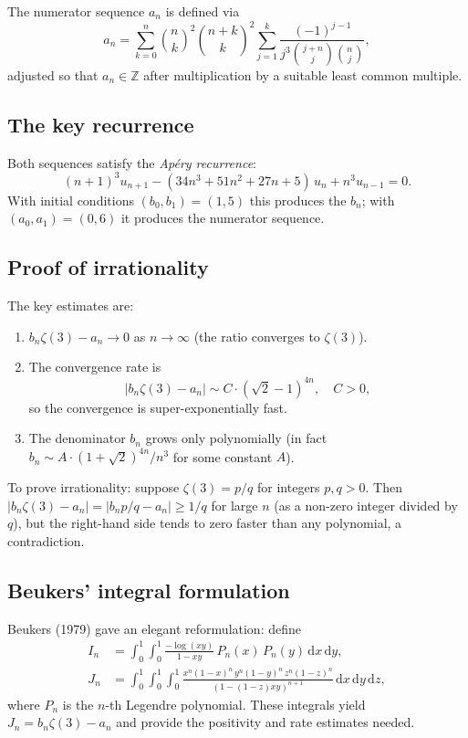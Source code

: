 \documentclass[12pt,a4paper]{amsart}
\theoremstyle{definition}
\theoremstyle{remark}
\begin{document}
The numerator sequence $a_n$ is defined via
\[
  a_n = \sum_{k=0}^{n} \binom{n}{k}^2 \binom{n+k}{k}^2
        \sum_{j=1}^{k} \frac{(-1)^{j-1}}{j^3 \binom{j+n}{j}\binom{n}{j}},
\]
adjusted so that $a_n \in \mathbb{Z}$ after multiplication by a suitable
least common multiple.

\subsection{The key recurrence}

Both sequences satisfy the \emph{Apéry recurrence}:
\begin{equation}
  (n+1)^3 u_{n+1} - (34n^3 + 51n^2 + 27n + 5)\, u_n + n^3 u_{n-1} = 0.
  \label{eq:apery-recurrence}
\end{equation}
With initial conditions $(b_0, b_1) = (1, 5)$ this produces the $b_n$; with
$(a_0, a_1) = (0, 6)$ it produces the numerator sequence.

\subsection{Proof of irrationality}

The key estimates are:
\begin{enumerate}[label=(\roman*)]
  \item $b_n \zeta(3) - a_n \to 0$ as $n \to \infty$ (the ratio converges to $\zeta(3)$).
  \item The convergence rate is
        \[
          |b_n \zeta(3) - a_n| \sim C \cdot (\sqrt{2} - 1)^{4n}, \quad C > 0,
        \]
        so the convergence is super-exponentially fast.
  \item The denominator $b_n$ grows only polynomially (in fact $b_n \sim A \cdot
        (1 + \sqrt{2})^{4n} / n^3$ for some constant $A$).
\end{enumerate}

To prove irrationality: suppose $\zeta(3) = p/q$ for integers $p, q > 0$.
Then $|b_n \zeta(3) - a_n| = |b_n p/q - a_n| \geq 1/q$ for large $n$ (as a
non-zero integer divided by $q$), but the right-hand side tends to zero faster
than any polynomial, a contradiction.

\subsection{Beukers' integral formulation}

Beukers (1979) gave an elegant reformulation: define
\begin{align*}
  I_n &= \int_0^1 \!\int_0^1 \frac{-\log(xy)}{1 - xy}\, P_n(x)\, P_n(y)\,
         \mathrm{d}x\, \mathrm{d}y, \\
  J_n &= \int_0^1 \!\int_0^1 \!\int_0^1
         \frac{x^n(1-x)^n\, y^n(1-y)^n\, z^n(1-z)^n}
              {(1 - (1-z)xy)^{n+1}}\,
         \mathrm{d}x\, \mathrm{d}y\, \mathrm{d}z,
\end{align*}
where $P_n$ is the $n$-th Legendre polynomial. These integrals yield
$J_n = b_n \zeta(3) - a_n$ and provide the positivity and rate estimates needed.
\end{document}
